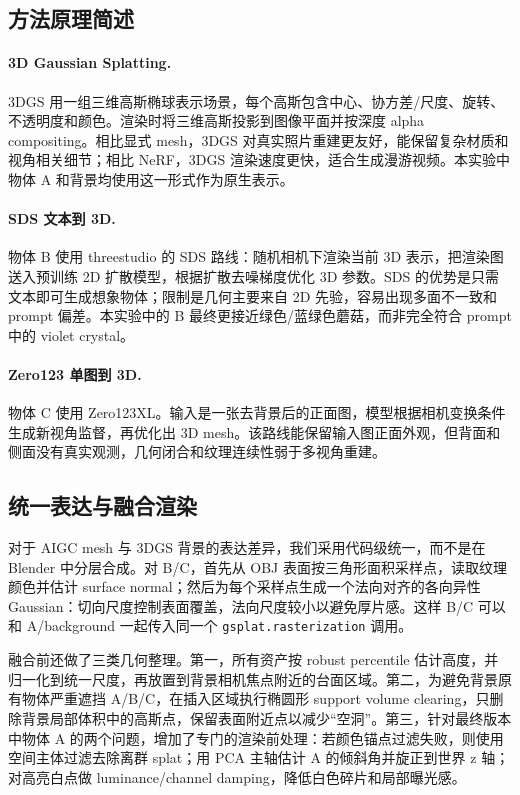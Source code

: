 \documentclass[lang=cn,a4paper,newtx,nofont,code=minted]{elegantpaper}
\begin{document}
\subsection{方法原理简述}

\paragraph{3D Gaussian Splatting.}
3DGS 用一组三维高斯椭球表示场景，每个高斯包含中心、协方差/尺度、旋转、不透明度和颜色。渲染时将三维高斯投影到图像平面并按深度 alpha compositing。相比显式 mesh，3DGS 对真实照片重建更友好，能保留复杂材质和视角相关细节；相比 NeRF，3DGS 渲染速度更快，适合生成漫游视频。本实验中物体 A 和背景均使用这一形式作为原生表示。

\paragraph{SDS 文本到 3D.}
物体 B 使用 threestudio 的 SDS 路线：随机相机下渲染当前 3D 表示，把渲染图送入预训练 2D 扩散模型，根据扩散去噪梯度优化 3D 参数。SDS 的优势是只需文本即可生成想象物体；限制是几何主要来自 2D 先验，容易出现多面不一致和 prompt 偏差。本实验中的 B 最终更接近绿色/蓝绿色蘑菇，而非完全符合 prompt 中的 violet crystal。

\paragraph{Zero123 单图到 3D.}
物体 C 使用 Zero123XL。输入是一张去背景后的正面图，模型根据相机变换条件生成新视角监督，再优化出 3D mesh。该路线能保留输入图正面外观，但背面和侧面没有真实观测，几何闭合和纹理连续性弱于多视角重建。

\subsection{统一表达与融合渲染}

对于 AIGC mesh 与 3DGS 背景的表达差异，我们采用代码级统一，而不是在 Blender 中分层合成。对 B/C，首先从 OBJ 表面按三角形面积采样点，读取纹理颜色并估计 surface normal；然后为每个采样点生成一个法向对齐的各向异性 Gaussian：切向尺度控制表面覆盖，法向尺度较小以避免厚片感。这样 B/C 可以和 A/background 一起传入同一个 \texttt{gsplat.rasterization} 调用。

融合前还做了三类几何整理。第一，所有资产按 robust percentile 估计高度，并归一化到统一尺度，再放置到背景相机焦点附近的台面区域。第二，为避免背景原有物体严重遮挡 A/B/C，在插入区域执行椭圆形 support volume clearing，只删除背景局部体积中的高斯点，保留表面附近点以减少“空洞”。第三，针对最终版本中物体 A 的两个问题，增加了专门的渲染前处理：若颜色锚点过滤失败，则使用空间主体过滤去除离群 splat；用 PCA 主轴估计 A 的倾斜角并旋正到世界 z 轴；对高亮白点做 luminance/channel damping，降低白色碎片和局部曝光感。
\end{document}
